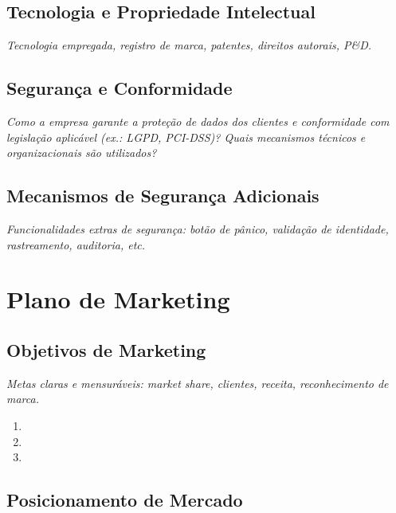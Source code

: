 \documentclass[
	12pt,
	openright,
	oneside,
	a4paper,
	chapter=TITLE,
	section=TITLE,
	english,
	brazil
	]{abntex2}
\newcommand{\icampo}{%
	\hrulefill
}
\newcommand{\instrucao}[1]{%
	\vspace{0.3cm}%
	\noindent%
	{%
		\setlength{\fboxsep}{6pt}%
		\colorbox{azul-claro}{%
			\begin{minipage}{\dimexpr\textwidth-2\fboxsep\relax}%
				\setlength{\parindent}{1.25cm}%
				{\color{cinza-instrucao}\small\itshape #1}%
			\end{minipage}%
		}%
	}%
	\vspace{0.3cm}%
}
\begin{document}
\section{Tecnologia e Propriedade Intelectual}

\instrucao{Tecnologia empregada, registro de marca, patentes, direitos autorais, P\&D.}

\section{Segurança e Conformidade}

\instrucao{Como a empresa garante a proteção de dados dos clientes e conformidade com legislação aplicável (ex.: LGPD, PCI-DSS)? Quais mecanismos técnicos e organizacionais são utilizados?}

\section{Mecanismos de Segurança Adicionais}

\instrucao{Funcionalidades extras de segurança: botão de pânico, validação de identidade, rastreamento, auditoria, etc.}

\clearpage

\chapter{Plano de Marketing}

\section{Objetivos de Marketing}

\instrucao{Metas claras e mensuráveis: market share, clientes, receita, reconhecimento de marca.}

\begin{enumerate}[itemsep=0.3cm]
	\item \icampo
	\item \icampo
	\item \icampo
\end{enumerate}

\section{Posicionamento de Mercado}
\end{document}
